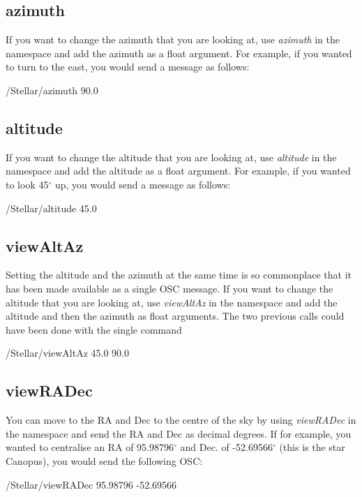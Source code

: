 \subsection{azimuth}
If you want to change the azimuth that you are looking at, use \textit{azimuth} in the namespace and add the azimuth as a float argument. For example, if you wanted to turn to the east, you would send a message as follows:
 \begin{syntax}	
	\medskip
	/Stellar/azimuth 90.0
	\medskip
\end{syntax}

\subsection{altitude}
If you want to change the altitude that you are looking at, use \textit{altitude} in the namespace and add the altitude as a float argument. For example, if you wanted to look 45$^{\circ}$ up, you would send a message as follows:
\begin{syntax}	
	\medskip
	/Stellar/altitude 45.0
	\medskip
\end{syntax}

\subsection{viewAltAz}
Setting the altitude and the azimuth at the same time is so commonplace that it has been made available as a single OSC message.
If you want to change the altitude that you are looking at, use \textit{viewAltAz} in the namespace and add the altitude and then the azimuth as float arguments. The two previous calls could have been done with the single command
\begin{syntax}	
	\medskip
	/Stellar/viewAltAz 45.0 90.0
	\medskip
\end{syntax}

\subsection{viewRADec}
You can move to the RA and Dec to the centre of the sky by using  \textit{viewRADec} in the namespace and send the RA and Dec as decimal degrees. If for example, you wanted to centralise  an RA of 95.98796$^{\circ}$  and Dec. of -52.69566$^{\circ}$  (this is the star Canopus), you would send the following OSC:
 \begin{syntax}	
 	\medskip
 	/Stellar/viewRADec 95.98796 -52.69566
 	\medskip
 \end{syntax}
 
